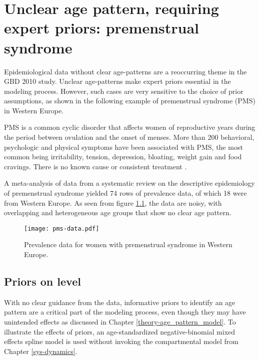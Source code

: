 \chapter{Unclear age pattern, requiring expert priors: premenstrual syndrome}
\label{applications-priors_knots_select}

Epidemiological data without clear age-patterns are a reoccurring theme in the GBD 2010 study.  Unclear age-patterns make expert priors essential in the modeling process.  However, such cases are very sensitive to the choice of prior assumptions, as shown in the following example of premenstrual syndrome (PMS) in Western Europe.

PMS is a common cyclic disorder that affects women of reproductive years during the period between ovulation and the onset of menses.  More than 200 behavioral, psychologic and physical symptoms have been associated with PMS, the most common being irritability, tension, depression, bloating, weight gain and food cravings.  There is no known cause or consistent treatment \cite{dickerson_premenstrual_2003, singh_incidence_1998, goodale_alleviation_1990}.

A meta-analysis of data from a systematic review on the descriptive epidemiology of premenstrual syndrome yielded 74 rows of prevalence data, of which 18 were from Western Europe.  As seen from figure \ref{fig:app-pms_data}, the data are noisy, with overlapping and heterogeneous age groups that show no clear age pattern.

    \begin{figure}[h]
        \begin{center}
            \texttt{[image: pms-data.pdf]}
            \caption{Prevalence data for women with premenstrual syndrome in Western Europe.}
        \end{center}
        \label{fig:app-pms_data}
    \end{figure}

\section{Priors on level} \label{sec:app-priors on level}
With no clear guidance from the data, informative priors to identify an age pattern are a critical part of the modeling process, even though they may have unintended effects as discussed in Chapter \ref{theory-age_pattern_model}.  To illustrate the effects of priors, an age-standardized negative-binomial mixed effects spline model is used without invoking the compartmental model from Chapter \ref{sys-dynamics}.

